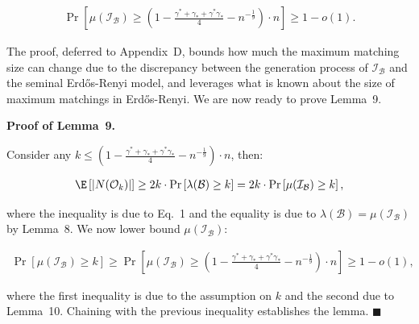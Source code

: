 \[\begin{gathered}
\Pr\left[\mu(\mathcal{I}_{\mathcal{B}})\geq\left(1-\frac{\gamma^{*}+\gamma_{*}+\gamma^{*}\gamma_{*}}{4}-n^{-\frac{1}{9}}\right)\cdot n\right]\geq 1-o(1).
\end{gathered}\]






The proof, deferred to Appendix D, bounds how much the maximum matching size can change due to the discrepancy between the generation process of $\mathcal{I}_{\mathcal{B}}$ and the seminal Erdős-Renyi model, and leverages what is known about the size of maximum matchings in Erdős-Renyi. We are now ready to prove Lemma 9.\par




\par\medskip\noindent\textbf{Proof of Lemma 9.}\par



Consider any $k\leq\left(1-\frac{\gamma^{*}+\gamma_{*}+\gamma^{*}\gamma_{*}}{4}-n^{-\frac{1}{9}}\right)\cdot n$, then:\par


\[\begin{gathered}
\displaystyle\E\left[|N(\mathcal{O}_{k})|\right]\geq 2k\cdot\Pr\left[\lambda(\mathcal{B})\geq k\right]=2k\cdot\Pr\left[\mu(\mathcal{I}_{\mathcal{B}})\geq k\right],
\end{gathered}\]


where the inequality is due to Eq. 1 and the equality is due to $\lambda(\mathcal{B})=\mu(\mathcal{I}_{\mathcal{B}})$ by Lemma 8.
We now lower bound $\mu(\mathcal{I}_{\mathcal{B}})$:\par


\[\begin{gathered}
\displaystyle\Pr\left[\mu(\mathcal{I}_{\mathcal{B}})\geq k\right]\geq\Pr\left[\mu(\mathcal{I}_{\mathcal{B}})\geq\left(1-\frac{\gamma^{*}+\gamma_{*}+\gamma^{*}\gamma_{*}}{4}-n^{-\frac{1}{9}}\right)\cdot n\right]\geq 1-o(1),
\end{gathered}\]


where the first inequality is due to the assumption on $k$ and the second due to Lemma 10.
Chaining with the previous inequality establishes the lemma.
\ensuremath{\blacksquare}\par






